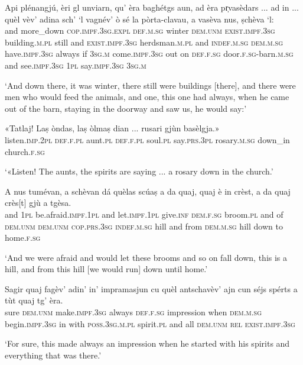 \begin{linenumbers}
\gll    Api plénangjú, èri gl unviarn, qu’ èra baghétgs aun, ad èra pr̩vasèdars ... ad in ... quèl vèv’ adina sch’ `l vagnév’ ò sé la pòrta-clavau, a vasèva nus, ṣchèva `l: \\
  and more\_down \textsc{cop.impf.3sg.expl} \textsc{def.m.sg} winter \textsc{dem.unm} \textsc{exist.impf.3sg} building.\textsc{m.pl} still and \textsc{exist.impf.3sg} herdsman.\textsc{m.pl} {} and \textsc{indef.m.sg} {} \textsc{dem.m.sg} have.\textsc{impf.3sg} always if \textsc{3sg.m} come.\textsc{impf.3sg} out on \textsc{def.f.sg} door.\textsc{f.sg}-barn.\textsc{m.sg} and see.\textsc{impf.3sg} \textsc{1pl} say.\textsc{impf.3sg} \textsc{3sg.m} \\
\end{linenumbers}
\medskip
\glt `And down there, it was winter, there still were buildings [there], and there were men who would feed the animals, and one, this one had always, when he came out of the barn, staying in the doorway and saw us, he would say:'
\medskip

\begin{linenumbers}
\gll «Tatlaj! Laṣ òndas, laṣ òlmaṣ dian ... rusari gjùn basèlgja.»  \\
     listen.\textsc{imp.2pl} \textsc{def.f.pl} aunt.\textsc{pl} \textsc{def.f.pl} soul.\textsc{pl} say.\textsc{prs.3pl} {} rosary.\textsc{m.sg} down\_in church.\textsc{f.sg}\\
\end{linenumbers}
\medskip
\glt `«Listen! The aunts, the spirits are saying ... a rosary down in the church.'
\medskip

\begin{linenumbers}
\gll A nus tumévan, a schèvan dá quèlas scúaṣ a da quaj, quaj è in crèst, a da quaj crès[t] gjù a tgèsa.\\
  and \textsc{1pl} be.afraid.\textsc{impf.1pl} and let.\textsc{impf.1pl} give.\textsc{inf} \textsc{dem.f.sg} broom.\textsc{pl} and of \textsc{dem.unm} \textsc{dem.unm} \textsc{cop.prs.3sg} \textsc{indef.m.sg} hill and from \textsc{dem.m.sg} hill down to home.\textsc{f.sg}\\
\end{linenumbers}
\medskip
\glt `And we were afraid and would let these brooms and so on fall down, this is a hill, and from this hill [we would run] down until home.'
\medskip

\begin{linenumbers}
\gll  Sagir quaj fagèv’ adin’ in’ impramasjun\footnotemark{} cu quèl antschavèv’ ajn cun séjs spérts a tùt quaj tg’ èra.  \\
sure \textsc{dem.unm} make.\textsc{impf.3sg} always \textsc{def.f.sg} impression when \textsc{dem.m.sg} begin.\textsc{impf.3sg} in with \textsc{poss.3sg.m.pl} spirit.\textsc{pl}  and all \textsc{dem.unm} \textsc{rel} \textsc{exist.impf.3sg}  \\
\end{linenumbers}
\medskip
\glt `For sure, this made always an impression when he started with his spirits and everything that was there.'
\medskip

